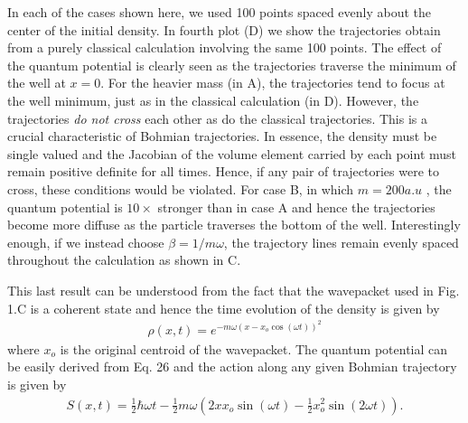 In each of the cases shown here, we used 100 points spaced evenly 
about the center of the initial density.  In fourth plot (D) we show 
the trajectories obtain from a purely classical calculation involving 
the same 100 points.  The effect of the quantum potential is clearly 
seen as the trajectories traverse the minimum of the well at $x=0$. 
For the heavier mass (in A), the trajectories tend to focus 
at the well minimum, just as in the classical calculation (in D).  
However, the trajectories {\em do not cross} each other as do the 
classical trajectories.  This is a crucial characteristic of Bohmian 
trajectories.  In essence, the density must be single valued and the 
Jacobian of the volume element carried by each point must remain 
positive definite for all times.  Hence, if any pair of trajectories 
were to cross, these conditions would be violated.  For case B, in 
which $m=200 a.u$ , the quantum potential is $10\times$ stronger 
than in case A and hence the trajectories become more 
diffuse as the particle traverses the bottom of the well.  
Interestingly enough, if we instead choose $\beta = 1/m\omega $, 
the trajectory lines remain evenly 
spaced throughout the calculation as shown in C.

This last result can be understood from the fact that the wavepacket 
used in Fig.  1.C is a coherent state and hence 
the time evolution of the density is given by
\begin{eqnarray}
\rho (x,t) = e^{-m\omega (x-{x_o}\cos(\omega t))^2}
    \label{eq:coherent}
\end{eqnarray}
where $x_o$ is the original centroid of the wavepacket.  The quantum 
potential can be easily derived from Eq.  26 and the action along any 
given Bohmian trajectory is given by~\cite{ref08}
\begin{eqnarray}
S(x,t)=\frac{1}{2}\hbar \omega  t
-\frac{1}{2}m   \omega    \left(2   x   {x_o}\sin(\omega
   t)-\frac{1}{2}x_{o}^{2}\sin(2   \omega    t)\right).
   \label{eq:27}
\end{eqnarray}

